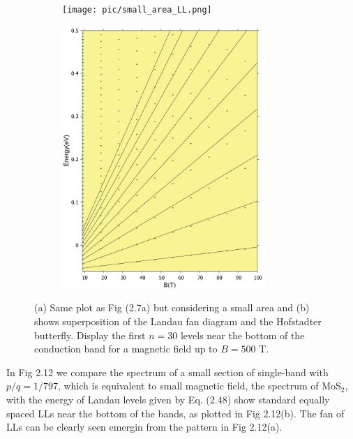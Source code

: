\documentclass{report}
\begin{document}
\begin{figure}[htb]
	\centering
	\begin{subfigure}[b]{0.49\textwidth}
		\centering
		{\texttt{[image: pic/small\_area\_LL.png]}}
	\end{subfigure}
	\begin{subfigure}[b]{0.49\textwidth}
		\centering
		\includegraphics[width=0.85\textwidth,height=1.2\linewidth]{pic/landaulevel_h0_q_797.pdf}
	\end{subfigure}
	\caption[Landau levels in Hofstadter butterfly.]{
		(a) Same plot as Fig (2.7a) but considering a small area and (b) shows superposition of the Landau fan diagram and the Hofstadter butterfly. Display the first $n = 30$ levels near the bottom of the conduction band for a magnetic field up to $B = 500$ T.
	}
\end{figure}

In Fig 2.12 we compare the spectrum of a small section of single-band with $p / q = 1 / 797$, which is equivalent to small magnetic field, the spectrum of MoS$_{2}$, with the energy of Landau levels given by Eq. (2.48) show standard equally spaced \ac{LLs} \cite{Shoenberg_1984,singleton2001band,blundell2001magnetism,kittel1987quantum} near the bottom of the bands, as plotted in Fig 2.12(b). The fan of \ac{LLs} can be clearly seen emergin from the pattern in Fig 2.12(a).
\end{document}

